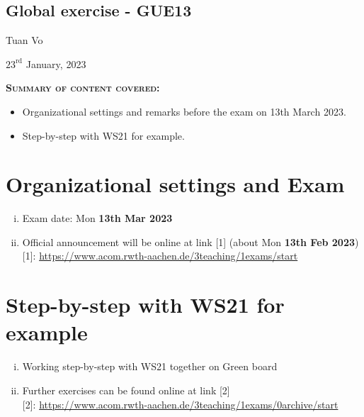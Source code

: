 \documentclass[12pt]{article}
\begin{document}
\begin{center}
	\section*{Global exercise - GUE13}
\end{center}
\begin{center}
	Tuan Vo
\end{center}
\begin{center}
	$23^{\text{rd}}$ January, 2023
\end{center}
\textbf{\textsc{Summary of content covered:}}
\begin{itemize}
	\item[\checkmark] Organizational settings and remarks before the exam on 13th March 2023.
	\item[\checkmark] Step-by-step with WS21 for example.
\end{itemize}
\section{Organizational settings and Exam}
\begin{enumerate}[(i)]
	\item Exam date: Mon \textbf{13th Mar 2023}
	\item Official announcement will be online at link [1] (about Mon \textbf{13th Feb 2023})\\
	      
	      [1]: \url{https://www.acom.rwth-aachen.de/3teaching/1exams/start}
\end{enumerate}

\section{Step-by-step with WS21 for example}

\begin{enumerate}[(i)]
	\item Working step-by-step with WS21 together on Green board
	\item Further exercises can be found online at link [2]\\
	      
	      [2]: \url{https://www.acom.rwth-aachen.de/3teaching/1exams/0archive/start}
\end{enumerate}



% 
\end{document}
